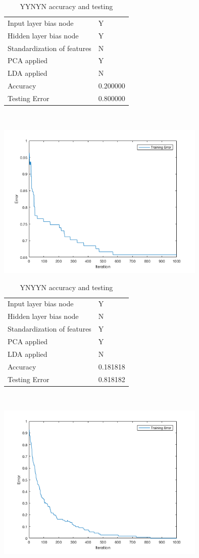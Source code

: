 \documentclass[12pt]{article}
\newcommand{\accuracyAndTestErrorTable}[8]{
  \begin{tabular}{l|l}
    \hline
    Input layer bias node & #1 \\
    Hidden layer bias node & #2 \\
    Standardization of features & #3 \\
    PCA applied & #4 \\
    LDA applied & #5 \\
    \hline
    Accuracy & #6 \\
    Testing Error & #7 \\
    \hline
  \end{tabular}
  ~\\[60pt]
  \caption{#8}
}
\begin{document}
\begin{center}
  \begin{table}[H]
    \begin{varwidth}[b]{0.4\linewidth}
      \centering
      \accuracyAndTestErrorTable{Y}{Y}{N}{Y}{N}{0.200000}{0.800000}{YYNYN accuracy and testing}
      \label{table:YYNYN}
    \end{varwidth}%
    \hfill
    \begin{minipage}[b]{0.6\linewidth}
      \centering
      \includegraphics[width=100mm]{YYNYN_training_error.png}
      \label{fig:YYNYN}
    \end{minipage}
  \end{table}
\end{center}




\begin{center}
  \begin{table}[H]
    \begin{varwidth}[b]{0.4\linewidth}
      \centering
      \accuracyAndTestErrorTable{Y}{N}{Y}{Y}{N}{0.181818}{0.818182}{YNYYN accuracy and testing}
      \label{table:YNYYN}
    \end{varwidth}%
    \hfill
    \begin{minipage}[b]{0.6\linewidth}
      \centering
      \includegraphics[width=100mm]{YNYYN_training_error.png}
      \label{fig:YNYYN}
    \end{minipage}
  \end{table}
\end{center}
\end{document}
